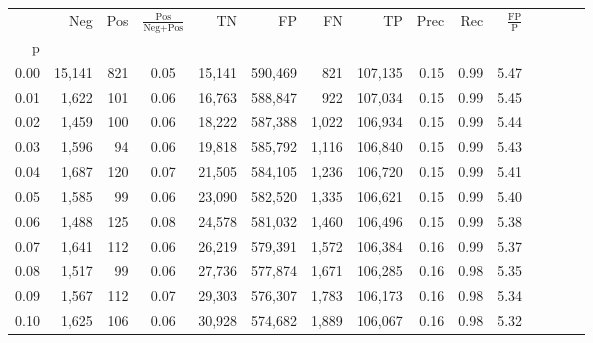 \begin{tabular}{rrrcrrrrrrrrrrr}
\toprule
{} &     Neg &    Pos & $\frac{\text{Pos}}{\text{Neg}+\text{Pos}}$ &       TN &       FP &       FN &       TP &  Prec &   Rec & $\frac{\text{FP}}{\text{P}}$ \\
p    &         &        &                                            &          &          &          &          &       &       &                              \\
\midrule
0.00 &  15,141 &    821 &                                       0.05 &   15,141 &  590,469 &      821 &  107,135 &  0.15 &  0.99 &                         5.47 \\
0.01 &   1,622 &    101 &                                       0.06 &   16,763 &  588,847 &      922 &  107,034 &  0.15 &  0.99 &                         5.45 \\
0.02 &   1,459 &    100 &                                       0.06 &   18,222 &  587,388 &    1,022 &  106,934 &  0.15 &  0.99 &                         5.44 \\
0.03 &   1,596 &     94 &                                       0.06 &   19,818 &  585,792 &    1,116 &  106,840 &  0.15 &  0.99 &                         5.43 \\
0.04 &   1,687 &    120 &                                       0.07 &   21,505 &  584,105 &    1,236 &  106,720 &  0.15 &  0.99 &                         5.41 \\
0.05 &   1,585 &     99 &                                       0.06 &   23,090 &  582,520 &    1,335 &  106,621 &  0.15 &  0.99 &                         5.40 \\
0.06 &   1,488 &    125 &                                       0.08 &   24,578 &  581,032 &    1,460 &  106,496 &  0.15 &  0.99 &                         5.38 \\
0.07 &   1,641 &    112 &                                       0.06 &   26,219 &  579,391 &    1,572 &  106,384 &  0.16 &  0.99 &                         5.37 \\
0.08 &   1,517 &     99 &                                       0.06 &   27,736 &  577,874 &    1,671 &  106,285 &  0.16 &  0.98 &                         5.35 \\
0.09 &   1,567 &    112 &                                       0.07 &   29,303 &  576,307 &    1,783 &  106,173 &  0.16 &  0.98 &                         5.34 \\
0.10 &   1,625 &    106 &                                       0.06 &   30,928 &  574,682 &    1,889 &  106,067 &  0.16 &  0.98 &                         5.32 \\

\end{tabular}
